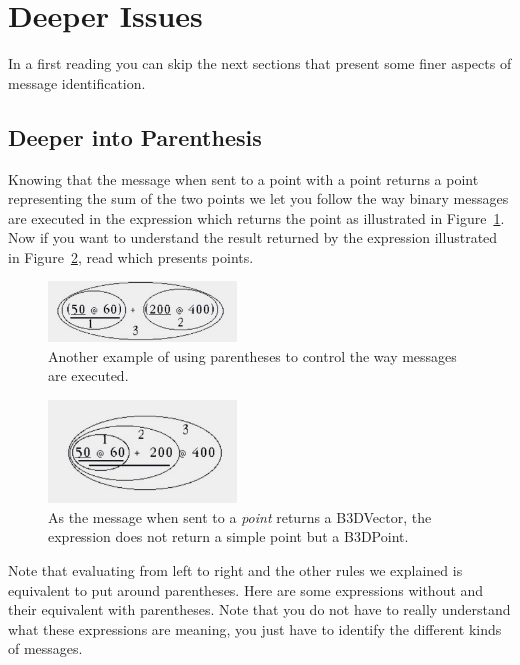  \section{Deeper Issues}
In a first reading you can skip the next sections that present some finer aspects of message identification.

\subsection{Deeper into Parenthesis}
Knowing that the message \ct{+} when sent to a point with a point returns a point representing the sum of the two points we let you follow the way binary messages are executed in the expression  which returns the point  as illustrated in Figure~\ref{fig:compoBinBracket}. Now if you want to understand the result returned by the expression  illustrated in Figure~\ref{fig:compoBinNoBracket}, read  which presents points.


\begin{figure}[h]
\centerline{\includegraphics[width=5cm]{ucompoBinBracket}} 
\caption{Another example of using parentheses to control the way messages are executed.\label{fig:compoBinBracket}}
\end{figure}

\begin{figure}[h]
\centerline{\includegraphics[width=5cm]{ucompoBinNoBracket}} 
\caption{As the message  when sent to a \textit{point} returns a B3DVector, the expression does not return a simple point but a B3DPoint.  \label{fig:compoBinNoBracket}}
\end{figure}




Note that evaluating from left to right and the other rules we explained is equivalent to put around parentheses. Here are some expressions without and their equivalent with parentheses. Note that you do not have to really understand what these expressions are meaning, you just have to identify the different kinds of messages.

